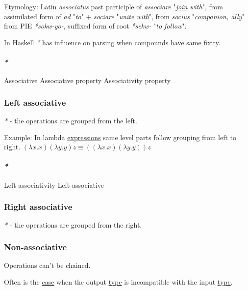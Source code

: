 \documentclass[a4paper,14pt,oneside]{book}
\begin{document}
Etymology:
Latin \emph{associatus} past participle of \emph{associare} "\emph{\hyperref[orgefa0ef8]{join} with}", from assimilated form of \emph{ad} "\emph{to}" + \emph{sociare} "\emph{unite with}", from \emph{socius} "\emph{companion, ally}" from PIE \emph{*sokw-yo-}, suffixed form of root \emph{*sekw-} "\emph{to follow}".

In Haskell \emph{*} has influence on parsing when compounds have same \hyperref[org29f2275]{fixity}.

\paragraph{\emph{*}}
\label{sec:orgf6340aa}

\label{org4a47743}Associative
\label{org0b78fc8}Associative property
\label{orgb73307d}Associativity property

\subsubsection{\label{org6522f5c}Left associative}
\label{sec:orgc48d5d0}
\emph{*} - the operations are grouped from the left.

Example:
In lambda \hyperref[org7a322dc]{expressions} same level parts follow grouping from left to right.
\((\lambda x . x)(\lambda y . y)z \equiv ((\lambda x . x)(\lambda y . y))z\)

\paragraph{\emph{*}}
\label{sec:orga9cbdf4}

\label{orgb442ebd}Left associativity
\label{org788d53c}Left-associative

\subsubsection{\label{org568d6a5}Right associative}
\label{sec:orgedfd2b7}
\emph{*} - the operations are grouped from the right.

\subsubsection{\label{org06ddc77}Non-associative}
\label{sec:org2f169fa}
Operations can't be chained.

Often is the \hyperref[orgea199c2]{case} when the output \hyperref[orga7d212f]{type} is incompatible with the input \hyperref[orga7d212f]{type}.
\end{document}
